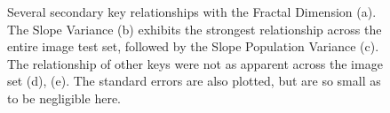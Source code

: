 \documentclass[12pt, oneside]{book}
\begin{document}
\begin{figure}[H] %
  \centering            %
  \caption[Several secondary key relationships with the Fractal Dimension]{Several secondary key relationships with the Fractal Dimension (a).  The Slope Variance (b) exhibits the strongest relationship across the entire image test set, followed by the Slope Population Variance (c).  The relationship of other keys were not as apparent across the image set (d), (e).  The standard errors are also plotted, but are so small as to be negligible here.}
  \label{fig:keyComparison}
\end{figure}
\end{document}
